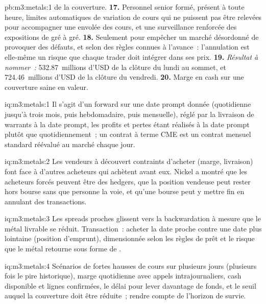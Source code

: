 \begin{solution}{pb:m3:metals:1}
de la couverture. \textbf{17.} Personnel senior formé, présent à toute heure, limites automatiques de variation de cours qui ne puissent pas être
relevées pour accompagner une envolée des cours, et une surveillance renforcée des expositions de gré à gré.
\textbf{18.} Seulement pour empêcher un marché désordonné de provoquer des défauts, et selon des règles connues à
l'avance~: l'annulation est elle-même un risque que chaque trader doit intégrer dans ses prix. \textbf{19.} \emph{Résultat à nommer~:}
532.87~millions d'USD de la clôture du lundi au sommet, et 724.46~millions d'USD de la clôture du vendredi.
\textbf{20.} Marge en cash sur une couverture saine en valeur.
\end{solution}

\begin{solution}{iq:m3:metals:1}
Il s'agit d'un forward sur une date prompt donnée (quotidienne jusqu'à trois mois, puis hebdomadaire, puis mensuelle), réglé
par la livraison de warrants à la date prompt, les profits et pertes étant réalisés à la date prompt plutôt que
quotidiennement~; un contrat à terme CME est un contrat mensuel standard réévalué au marché chaque jour.
\end{solution}

\begin{solution}{iq:m3:metals:2}
Les vendeurs à découvert contraints d'acheter (marge, livraison) font face à d'autres acheteurs qui achètent avant eux. Nickel a montré
que les acheteurs forcés peuvent être des hedgers, que la position vendeuse peut rester hors bourse sans que personne la voie, et
qu'une bourse peut y mettre fin en annulant des transactions.
\end{solution}

\begin{solution}{iq:m3:metals:3}
Les spreads proches glissent vers la backwardation à mesure que le métal livrable se réduit. Transaction~: acheter la date proche
contre une date plus lointaine (position d'emprunt), dimensionnée selon les règles de prêt et le risque que le métal
retourne sous forme de .
\end{solution}

\begin{solution}{iq:m3:metals:4}
Scénarios de fortes hausses de cours sur plusieurs jours (plusieurs fois le pire historique), marge quotidienne avec
appels intrajournaliers, cash disponible et lignes confirmées, le délai pour lever davantage de fonds, et le seuil auquel
la couverture doit être réduite~; rendre compte de l'horizon de survie.
\end{solution}

